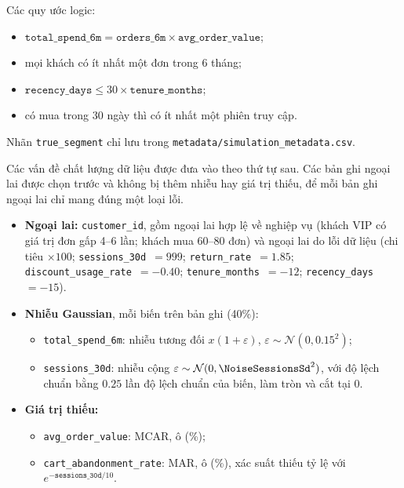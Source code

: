 \documentclass[11pt,a4paper]{article}
\begin{document}
Các quy ước logic:
\begin{itemize}
  \item $\texttt{total\_spend\_6m} = \texttt{orders\_6m} \times \texttt{avg\_order\_value}$;
  \item mọi khách có ít nhất một đơn trong 6 tháng;
  \item $\texttt{recency\_days} \le 30 \times \texttt{tenure\_months}$;
  \item có mua trong 30 ngày thì có ít nhất một phiên truy cập.
\end{itemize}
Nhãn \texttt{true\_segment} chỉ lưu trong \texttt{metadata/simulation\_metadata.csv}.

Các vấn đề chất lượng dữ liệu được đưa vào theo thứ tự sau. Các bản ghi ngoại lai được chọn trước và không bị thêm nhiễu hay giá trị thiếu, để mỗi bản ghi ngoại lai chỉ mang đúng một loại lỗi.
\begin{itemize}
  \item \textbf{Ngoại lai:} \OutlierIds{} \texttt{customer\_id}, gồm \OutlierBusiness{} ngoại lai hợp lệ về nghiệp vụ (khách VIP có giá trị đơn gấp 4–6 lần; khách mua 60–80 đơn) và \OutlierError{} ngoại lai do lỗi dữ liệu (chi tiêu $\times 100$; \texttt{sessions\_30d}~$=999$; \texttt{return\_rate}~$=1.85$; \texttt{discount\_usage\_rate}~$=-0.40$; \texttt{tenure\_months}~$=-12$; \texttt{recency\_days}~$=-15$).
  \item \textbf{Nhiễu Gaussian}, mỗi biến trên \NoiseRecords{} bản ghi (40\%):
    \begin{itemize}
      \item \texttt{total\_spend\_6m}: nhiễu tương đối $x(1+\varepsilon)$, $\varepsilon \sim \mathcal{N}(0, 0.15^2)$;
      \item \texttt{sessions\_30d}: nhiễu cộng $\varepsilon \sim \mathcal{N}(0, \NoiseSessionsSd^2)$, với độ lệch chuẩn bằng $0.25$ lần độ lệch chuẩn của biến, làm tròn và cắt tại 0.
    \end{itemize}
  \item \textbf{Giá trị thiếu:}
    \begin{itemize}
      \item \texttt{avg\_order\_value}: MCAR, \MissAovCount{} ô (\MissAovPct\%);
      \item \texttt{cart\_abandonment\_rate}: MAR, \MissCartCount{} ô (\MissCartPct\%), xác suất thiếu tỷ lệ với $e^{-\texttt{sessions\_30d}/10}$.
    \end{itemize}
\end{itemize}
\end{document}
